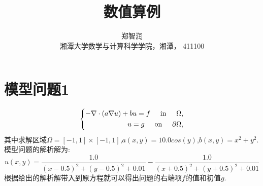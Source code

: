 \documentclass[9pt, a4paper,eqno]{article}
\theoremstyle{plain}
\begin{document}
\begin{CJK}{UTF8}{gkai}
\title{\LARGE
数值算例 
 }


\author {郑智润  \\
\small{湘潭大学数学与计算科学学院，湘潭， 411100 }  \\
}


\date{}

\maketitle \thispagestyle{empty} \large{
}

\section{模型问题1}
\begin{equation}
\left\{
\begin{aligned}
-\nabla \cdot (a\nabla u ) + bu = f  
\hspace{0.5 cm}{\rm in}\hspace{0.5 cm}\Omega,\\
 u = g \hspace{0.5 cm}{\rm on}\hspace{0.5 cm} \partial \Omega,
\end{aligned}
\right.
\end{equation}
其中求解区域$\Omega = \left[ -1,1 \right] \times \left[ -1,1 \right]$,$a(x,y)=10.0cos(y)$,$b(x,y)=x^{2} + y^{2}.$
模型问题的解析解为: $$u(x,y)= \dfrac{1.0}{(x-0.5)^{2}+(y-0.5)^{2}+0.01} - \dfrac{1.0}{(x+0.5)^{2}+(y+0.5)^{2}+0.01}$$
根据给出的解析解带入到原方程就可以得出问题的右端项$f$的值和初值$g$.





\end{CJK}
\end{document}

